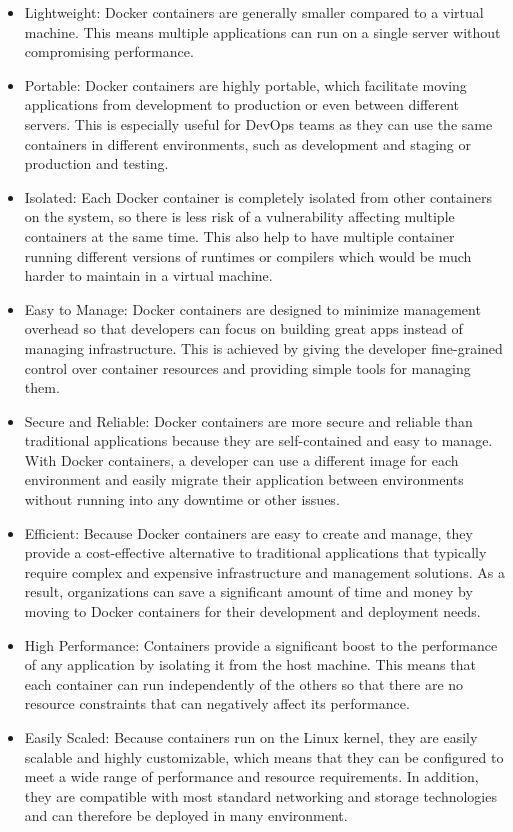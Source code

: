 \documentclass[MMR,Master,nenglish]{twbook}%
\begin{document}
\begin{itemize}
\item Lightweight: Docker containers are generally smaller compared to a virtual machine. This means multiple applications can run on a single server without compromising performance.\cite{vmwcovsvm}

\item Portable: Docker containers are highly portable, which facilitate moving applications from development to production or even between different servers.\cite{rad2017} This is especially useful for DevOps teams as they can use the same containers in different environments, such as development and staging or production and testing.

\item Isolated: Each Docker container is completely isolated from other containers on the system, so there is less risk of a vulnerability affecting multiple containers at the same time.\cite{com2016} This also help to have multiple container running different versions of runtimes or compilers which would be much harder to maintain in a virtual machine.

\item Easy to Manage: Docker containers are designed to minimize management overhead so that developers can focus on building great apps instead of managing infrastructure. This is achieved by giving the developer fine-grained control over container resources and providing simple tools for managing them. 

\item Secure and Reliable: Docker containers are more secure and reliable than traditional applications because they are self-contained and easy to manage. With Docker containers, a developer can use a different image for each environment and easily migrate their application between environments without running into any downtime or other issues. 

\item Efficient: Because Docker containers are easy to create and manage, they provide a cost-effective alternative to traditional applications that typically require complex and expensive infrastructure and management solutions. As a result, organizations can save a significant amount of time and money by moving to Docker containers for their development and deployment needs. 

\item High Performance: Containers provide a significant boost to the performance of any application by isolating it from the host machine. This means that each container can run independently of the others so that there are no resource constraints that can negatively affect its performance.\cite{rad2017}

\item Easily Scaled: Because containers run on the Linux kernel, they are easily scalable and highly customizable, which means that they can be configured to meet a wide range of performance and resource requirements.\cite{rad2017} In addition, they are compatible with most standard networking and storage technologies and can therefore be deployed in many environment. 
\end{itemize}
\end{document}
